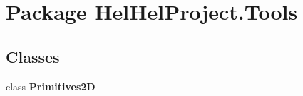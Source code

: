 \hypertarget{namespace_hel_hel_project_1_1_tools}{}\section{Package Hel\+Hel\+Project.\+Tools}
\label{namespace_hel_hel_project_1_1_tools}
\subsection*{Classes}
\begin{DoxyCompactItemize}
\item 
class {\bfseries Primitives2\+D}
\end{DoxyCompactItemize}
